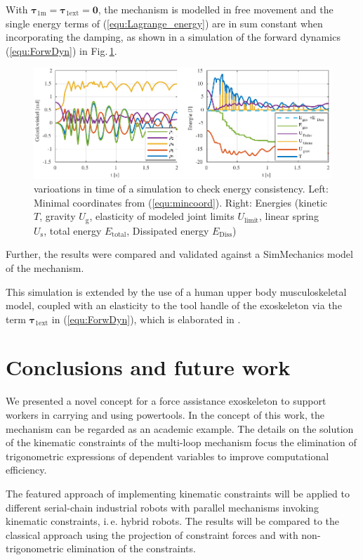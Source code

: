 \documentclass[letterpaper, 10 pt, conference]{ieeeconf}  %
\begin{document}
With ${\bm{\tau}_{1\mathrm{m}} = \bm{\tau}_{1\mathrm{ext}} = \bm{0}}$, the mechanism is modelled in free movement and the single energy terms of (\ref{equ:Lagrange_energy}) are in sum constant when incorporating the damping, as shown in a simulation of the forward dynamics (\ref{equ:ForwDyn}) in Fig.\,\ref{fig:SimulationEnergiekonsistenz}.
%
\begin{figure}[htb!]
    \includegraphics{figures/KAS5m5_Gelenkgrenzmodell_q_E.pdf} 
    \caption{varioations in time of a simulation to check energy consistency. Left: Minimal coordinates from (\ref{equ:mincoord}). Right: Energies (kinetic $T$, gravity $U_\mathrm{g}$, elasticity of modeled joint limits $U_\mathrm{limit}$, linear spring $U_\mathrm{s}$, total energy $E_\mathrm{total}$, Dissipated energy $E_\mathrm{Diss}$)}
    \label{fig:SimulationEnergiekonsistenz}
\end{figure} 
%
Further, the results were compared and validated against a SimMechanics model of the mechanism.

This simulation is extended by the use of a human upper body musculoskeletal model, coupled with an elasticity to the tool handle of the exoskeleton via the term $\bm{\tau}_{1\mathrm{ext}}$ in (\ref{equ:ForwDyn}), which is elaborated in \cite{KuehnHuSchHad2018}.

\section{Conclusions and future work}
\label{sec:conclusion}

We presented a novel concept for a force assistance exoskeleton to support workers in carrying and using powertools.
In the concept of this work, the mechanism can be regarded as an academic example.
The details on the solution of the kinematic constraints of the multi-loop mechanism focus the elimination of trigonometric expressions of dependent variables to improve computational efficiency.

The featured approach of implementing kinematic constraints will be applied to different serial-chain industrial robots with parallel mechanisms invoking kinematic constraints, i.\,e. hybrid robots. 
The results will be compared to the classical approach using the projection of constraint forces and with non-trigonometric elimination of the constraints.
\end{document}
